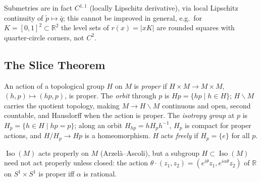 \begin{remark}
  \label{rem:pet-ch5-submetry-c11}
  Submetries are in fact $C^{1,1}$ (locally Lipschitz derivative), via local
  Lipschitz continuity of $\tilde p\mapsto\bar q$; this cannot be improved in
  general, e.g.\ for $K=[0,1]^2\subset\mathbb R^2$ the level sets of $r(x)=|xK|$ are
  rounded squares with quarter-circle corners, not $C^2$.
\end{remark}

\subsection{The Slice Theorem}

\begin{definition}
  \label{def:pet-ch5-proper-action}
  \leanok
  An action of a topological group $H$ on $M$ is \emph{proper} if
  $H\times M\to M\times M$, $(h,p)\mapsto(hp,p)$, is proper. The \emph{orbit}
  through $p$ is $Hp=\{hp\mid h\in H\}$; $H\backslash M$ carries the quotient
  topology, making $M\to H\backslash M$ continuous and open, second countable, and
  Hausdorff when the action is proper. The \emph{isotropy group} at $p$ is
  $H_p=\{h\in H\mid hp=p\}$; along an orbit $H_{hp}=hH_ph^{-1}$, $H_p$ is compact
  for proper actions, and $H/H_p\to Hp$ is a homeomorphism. $H$ acts \emph{freely}
  if $H_p=\{e\}$ for all $p$.
\end{definition}

\begin{example}
  \label{ex:pet-ch5-nonproper-action}
  $\operatorname{Iso}(M)$ acts properly on $M$ (Arzelà–Ascoli), but a subgroup
  $H\subset\operatorname{Iso}(M)$ need not act properly unless closed: the action
  $\theta\cdot(z_1,z_2)=(e^{i\theta}z_1,e^{i\alpha\theta}z_2)$ of $\mathbb R$ on
  $S^1\times S^1$ is proper iff $\alpha$ is rational.
\end{example}

